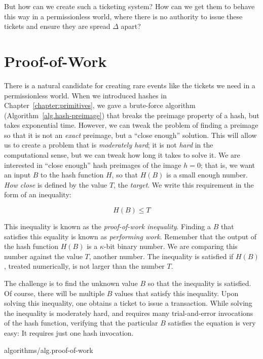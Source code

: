 But how can we create such a ticketing system? How can we get them to behave this way in a permissionless
world, where there is no authority to issue these tickets and ensure they are spread $\Delta$
apart?

\section{Proof-of-Work}

There is a natural candidate for creating rare events like the tickets we need in a permissionless
world. When we introduced hashes in Chapter~\ref{chapter:primitives}, we gave a brute-force algorithm
(Algorithm~\ref{alg.hash-preimage})
that breaks the preimage property of a hash, but takes exponential time. However, we can tweak
the problem of finding a preimage so that it is not an \emph{exact} preimage, but a ``close enough''
solution. This will allow us to create a problem that is \emph{moderately hard}; it is not \emph{hard}
in the computational sense, but we can tweak how long it takes to solve it. We are interested in
``close enough'' hash preimages of the image $h = 0$; that is, we want an input $B$ to the hash function
$H$, so that $H(B)$ is a small enough number. \emph{How close} is defined by the value $T$, the
\emph{target}.
We write this requirement in the form of an
inequality:

\[
    H(B) \leq T
\]

This inequality is known as the \emph{proof-of-work inequality}. Finding
a $B$ that satisfies this equality is known as \emph{performing work}.
Remember
that the output of the hash function $H(B)$ is a $\kappa$-bit binary number. We are comparing
this number against the value $T$, another number. The inequality is satisfied if $H(B)$, treated
numerically, is not larger than the number $T$.

The challenge is to find the unknown value $B$ so that the inequality is satisfied. Of course,
there will be multiple $B$ values that satisfy this inequality. Upon solving this inequality,
one obtains a ticket to issue a transaction. While solving the inequality is moderately hard,
and requires many trial-and-error invocations of the hash function, verifying that the particular
$B$ satisfies the equation is very easy: It requires just one hash invocation.

{algorithms/alg.proof-of-work}

